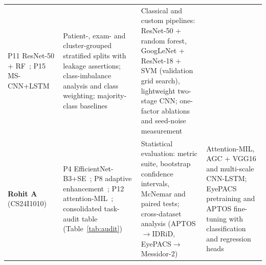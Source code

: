 \documentclass[journal]{IEEEtran}
\begin{document}
\begin{table}[!h]
\begin{tabular}{@{}>{\raggedright\arraybackslash}p{3.0cm}>{\raggedright\arraybackslash}p{4.1cm}>{\raggedright\arraybackslash}p{5.0cm}>{\raggedright\arraybackslash}p{5.2cm}@{}}
P11 ResNet-50 + RF~\cite{yaqoob2021resnet}; P15 MS-CNN+LSTM~\cite{sushith2025hybrid} &
Patient-, exam- and cluster-grouped stratified splits with leakage assertions; class-imbalance
analysis and class weighting; majority-class baselines &
Classical and custom pipelines: ResNet-50 + random forest, GoogLeNet + ResNet-18 + SVM (validation
grid search), lightweight two-stage CNN; one-factor ablations and seed-noise measurement \\
\addlinespace
\textbf{Rohit A} (CS24I1010) &
P4 EfficientNet-B3+SE~\cite{dixit2025effnet}; P8 adaptive enhancement~\cite{abbasi2025adaptive};
P12 attention-MIL~\cite{papadopoulos2021mil}; consolidated task-audit table (Table~\ref{tab:audit}) &
Statistical evaluation: metric suite, bootstrap confidence intervals, McNemar and paired tests;
cross-dataset analysis (APTOS$\rightarrow$IDRiD, EyePACS$\rightarrow$Messidor-2) &
Attention-MIL, AGC + VGG16 and multi-scale CNN-LSTM; EyePACS pretraining and APTOS fine-tuning with
classification and regression heads \\
\bottomrule
\end{tabular}
\end{table}
\end{document}
